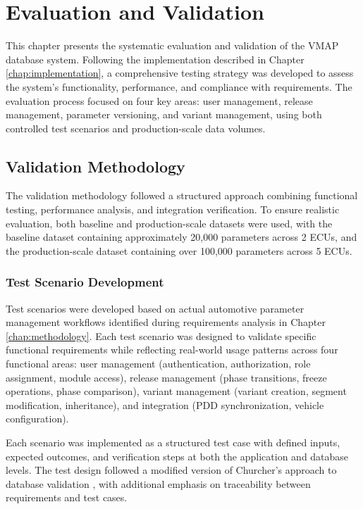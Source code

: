 \chapter{Evaluation and Validation}
\label{chap:evaluation}

This chapter presents the systematic evaluation and validation of the \ac{VMAP} database system. Following the implementation described in Chapter \ref{chap:implementation}, a comprehensive testing strategy was developed to assess the system's functionality, performance, and compliance with requirements. The evaluation process focused on four key areas: user management, release management, parameter versioning, and variant management, using both controlled test scenarios and production-scale data volumes.

\section{Validation Methodology}
\label{sec:validation-methodology}

The validation methodology followed a structured approach combining functional testing, performance analysis, and integration verification. To ensure realistic evaluation, both baseline and production-scale datasets were used, with the baseline dataset containing approximately 20,000 parameters across 2 \acp{ECU}, and the production-scale dataset containing over 100,000 parameters across 5 \acp{ECU}.

\subsection{Test Scenario Development}
\label{subsec:test-scenario-development}

Test scenarios were developed based on actual automotive parameter management workflows identified during requirements analysis in Chapter \ref{chap:methodology}. Each test scenario was designed to validate specific functional requirements while reflecting real-world usage patterns across four functional areas: user management (authentication, authorization, role assignment, module access), release management (phase transitions, freeze operations, phase comparison), variant management (variant creation, segment modification, inheritance), and integration (\ac{PDD} synchronization, vehicle configuration).

Each scenario was implemented as a structured test case with defined inputs, expected outcomes, and verification steps at both the application and database levels. The test design followed a modified version of Churcher's approach to database validation \cite{churcher2008beginning}, with additional emphasis on traceability between requirements and test cases.

